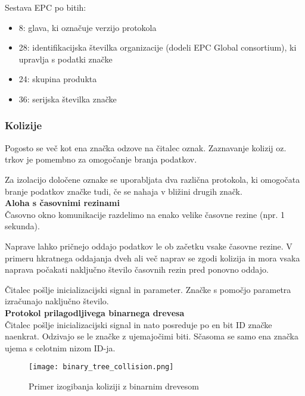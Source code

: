 \documentclass[]{article}
\begin{document}
\noindent
Sestava EPC po bitih:
\begin{itemize}
  \item 8: glava, ki označuje verzijo protokola
  \item 28: identifikacijska \v{s}tevilka organizacije (dodeli EPC
    Global consortium), ki upravlja s podatki zna\v{c}ke
  \item 24: skupina produkta
  \item 36: serijska \v{s}tevilka zna\v{c}ke
\end{itemize}

\subsubsection{Kolizije}
Pogosto se ve\v{c} kot ena zna\v{c}ka odzove na \v{c}italec oznak.
Zaznavanje kolizij oz. trkov je pomembno za omogočanje branja
podatkov.

Za izolacijo dolo\v{c}ene oznake se uporabljata dva razli\v{c}na
protokola, ki omogo\v{c}ata branje podatkov zna\v{c}ke tudi, \v{c}e
se nahaja v bli\v{z}ini drugih zna\v{c}k. \\

\noindent
\textbf{Aloha s \v{c}asovnimi rezinami} \\
\v{C}asovno okno komunikacije razdelimo na enako velike \v{c}asovne
rezine (npr. 1 sekunda).

Naprave lahko pri\v{c}nejo oddajo podatkov le ob za\v{c}etku vsake
\v{c}asovne rezine. V primeru hkratnega oddajanja dveh ali ve\v{c}
naprav se zgodi kolizija in mora vsaka naprava po\v{c}akati
naklju\v{c}no \v{s}tevilo \v{c}asovnih rezin pred ponovno oddajo.

\v{C}italec po\v{s}lje inicializacijski signal in parameter.
Zna\v{c}ke s pomo\v{c}jo parametra izra\v{c}unajo naklju\v{c}no
\v{s}tevilo.  \\

\noindent
\textbf{Protokol prilagodljivega binarnega drevesa} \\
\v{C}italec po\v{s}lje inicializacijski signal in nato posreduje po
en bit ID zna\v{c}ke naenkrat. Odzivajo se le zna\v{c}ke z
ujemajo\v{c}imi biti. S\v{c}asoma se samo ena zna\v{c}ka ujema s
celotnim nizom ID-ja.

\begin{figure}[H] %
  \centering
  \texttt{[image: binary\_tree\_collision.png]}
  \caption{Primer izogibanja koliziji z binarnim drevesom}
\end{figure}
\end{document}
